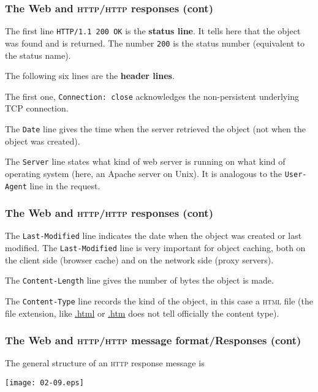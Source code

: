 %
\begin{frame}[containsverbatim]
\frametitle{The Web and \textsc{http}/\textsc{http} responses (cont)}

The first line \verb+HTTP/1.1 200 OK+ is the \textbf{status line}. It
tells here that the object was found and is returned. The number
\verb+200+ is the status number (equivalent to the status name). 

\bigskip

The following six lines are the \textbf{header lines}. 

\bigskip

The first one, \verb+Connection: close+ acknowledges the
non-persistent underlying TCP connection. 

\bigskip

The \verb+Date+ line gives the time when the server retrieved the
object (not when the object was created).

\bigskip

The \verb+Server+ line states what kind of web server is running on
what kind of operating system (here, an Apache server on Unix). It is
analogous to the \verb+User-Agent+ line in the request.

\end{frame}

%
\begin{frame}[containsverbatim]
\frametitle{The Web and \textsc{http}/\textsc{http} responses (cont)}

The \verb+Last-Modified+ line indicates the date when the object was
created or last modified. The \verb+Last-Modified+ line is very
important for object caching, both on the client side (browser cache)
and on the network side (proxy servers).

\bigskip

The \verb+Content-Length+ line gives the number of bytes the object is
made.

\bigskip

The \verb+Content-Type+ line records the kind of the object, in this
case a \textsc{html} file (the file extension, like \url{.html} or
\url{.htm} does not tell officially the content type).

\end{frame}

%
\begin{frame}
\frametitle{The Web and \textsc{http}/\textsc{http}
  message format/Responses (cont)}

The general structure of an \textsc{http} response message is
\begin{center}
\texttt{[image: 02-09.eps]}
\end{center}

\end{frame}

